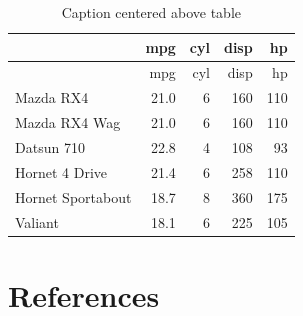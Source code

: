 \documentclass[preprint, 3p,
authoryear]{elsarticle} %
\begin{document}
\begin{longtable}[]{@{}lrrrr@{}}
\caption{\label{tab1}Caption centered above table}\tabularnewline
\toprule()
& mpg & cyl & disp & hp \\
\midrule()
\endfirsthead
\toprule()
& mpg & cyl & disp & hp \\
\midrule()
\endhead
Mazda RX4 & 21.0 & 6 & 160 & 110 \\
Mazda RX4 Wag & 21.0 & 6 & 160 & 110 \\
Datsun 710 & 22.8 & 4 & 108 & 93 \\
Hornet 4 Drive & 21.4 & 6 & 258 & 110 \\
Hornet Sportabout & 18.7 & 8 & 360 & 175 \\
Valiant & 18.1 & 6 & 225 & 105 \\
\bottomrule()
\end{longtable}

\hypertarget{references}{%
\section*{References}\label{references}}
\end{document}
